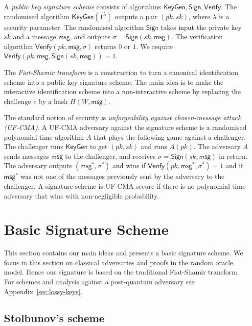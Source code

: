 \documentclass{llncs}
\newcommand{\msg}{\mathsf{msg}}
\newcommand{\KeyGen}{\mathsf{KeyGen}}
\newcommand{\Sign}{\mathsf{Sign}}
\newcommand{\Verify}{\mathsf{Verify}}
\begin{document}
A \emph{public key signature scheme} consists of algorithms $\KeyGen, \Sign, \Verify$.
The randomised algorithm $\KeyGen( 1^\lambda )$ outputs a pair $(pk,sk)$, where $\lambda$ is a security parameter.
The randomised algorithm $\Sign$ takes input the private key $sk$ and a message $\msg$, and  outputs $\sigma = \Sign( sk, \msg )$.
The verification algorithm $\Verify( pk, \msg, \sigma )$ returns $0$ or $1$.
We require $\Verify( pk, \msg, \Sign( sk, \msg )) = 1$.

The \emph{Fiat-Shamir transform} is a construction to turn a canonical identification scheme into a public key signature scheme. The main idea is to make the interactive identification scheme into a non-interactive scheme by replacing the challenge $c$ by a hash $H( W, \msg )$.

The standard notion of security is \emph{unforgeability against chosen-message attack (UF-CMA)}.
A UF-CMA adversary against the signature scheme is a randomised polynomial-time algorithm $A$ that plays the following game against a challenger.
The challenger runs $\KeyGen$ to get $(pk,sk)$ and runs $A( pk )$.
The adversary $A$ sends messages $\msg$ to the challenger, and receives $\sigma = \Sign(sk, \msg)$ in return.
The adversary outputs $(\msg^*, \sigma^*)$ and wins if $\Verify( pk, \msg^*, \sigma^* ) = 1$ and if $\msg^*$ was not one of the messages previously sent by the adversary to the challenger.
A signature scheme is UF-CMA secure if there is no polynomial-time adversary that wins with non-negligible probability.






\section{Basic Signature Scheme}\label{sec:basic-scheme}

This section contains our main ideas and presents a basic signature scheme.
We focus in this section on classical adversaries and proofs in the random oracle model.
Hence our signature is based on the traditional Fiat-Shamir transform.
For schemes and analysis against a post-quantum adversary see Appendix~\ref{sec:lossy-keys}.

\subsection{Stolbunov's scheme}\label{sec:Stolbunov}
\end{document}
